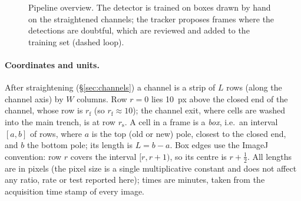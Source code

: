 \documentclass[11pt,a4paper]{article}
\newcommand{\rf}{r_{\mathrm{f}}}     %
\newcommand{\rs}{r_{\mathrm{s}}}     %
\begin{document}
\begin{figure}[ht]
\centering
{}
\caption{Pipeline overview. The detector is trained on boxes drawn by hand on the straightened channels; the tracker proposes frames where the detections are doubtful, which are reviewed and added to the training set (dashed loop).}
\label{fig:overview}
\end{figure}

\paragraph{Coordinates and units.} After straightening (\S\ref{sec:channels}) a channel is a strip of $L$ rows (along the channel axis) by $W$ columns. Row $r=0$ lies \SI{10}{px} above the closed end of the channel, whose row is $\rf$ (so $\rf\approx 10$); the channel exit, where cells are washed into the main trench, is at row $\rs$. A cell in a frame is a \emph{box}, i.e.\ an interval $[a,b]$ of rows, where $a$ is the top (old or new) pole, closest to the closed end, and $b$ the bottom pole; its length is $L=b-a$. Box edges use the ImageJ~\cite{schneider2012} convention: row $r$ covers the interval $[r,r+1)$, so its centre is $r+\tfrac12$. All lengths are in pixels (the pixel size is a single multiplicative constant and does not affect any ratio, rate or test reported here); times are minutes, taken from the acquisition time stamp of every image.
\end{document}
